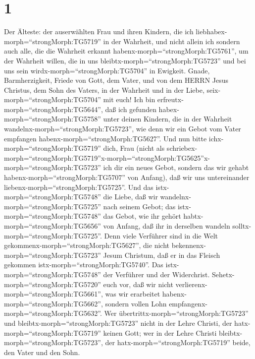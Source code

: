 \hypertarget{section}{%
\section{1}\label{section}}

 Der Älteste: der auserwählten Frau und ihren Kindern, die
ich liebhabex-morph=``strongMorph:TG5719'' in der Wahrheit, und nicht
allein ich sondern auch alle, die die Wahrheit erkannt
habenx-morph=``strongMorph:TG5761'',  um der Wahrheit
willen, die in uns bleibtx-morph=``strongMorph:TG5723'' und bei uns sein
wirdx-morph=``strongMorph:TG5704'' in Ewigkeit.  Gnade,
Barmherzigkeit, Friede von Gott, dem Vater, und von dem HERRN Jesus
Christus, dem Sohn des Vaters, in der Wahrheit und in der Liebe,
seix-morph=``strongMorph:TG5704'' mit euch!  Ich bin
erfreutx-morph=``strongMorph:TG5644'', daß ich gefunden
habex-morph=``strongMorph:TG5758'' unter deinen Kindern, die in der
Wahrheit wandelnx-morph=``strongMorph:TG5723'', wie denn wir ein Gebot
vom Vater empfangen habenx-morph=``strongMorph:TG5627''. 
Und nun bitte ichx-morph=``strongMorph:TG5719'' dich, Frau (nicht als
schriebex-morph=``strongMorph:TG5719''\textbar x-morph=``strongMorph:TG5625''x-morph=``strongMorph:TG5723''
ich dir ein neues Gebot, sondern das wir gehabt
habenx-morph=``strongMorph:TG5707'' von Anfang), daß wir uns
untereinander liebenx-morph=``strongMorph:TG5725''.  Und das
istx-morph=``strongMorph:TG5748'' die Liebe, daß wir
wandelnx-morph=``strongMorph:TG5725'' nach seinem Gebot; das
istx-morph=``strongMorph:TG5748'' das Gebot, wie ihr gehört
habtx-morph=``strongMorph:TG5656'' von Anfang, daß ihr in derselben
wandeln solltx-morph=``strongMorph:TG5725''.  Denn viele
Verführer sind in die Welt gekommenx-morph=``strongMorph:TG5627'', die
nicht bekennenx-morph=``strongMorph:TG5723'' Jesum Christum, daß er in
das Fleisch gekommen istx-morph=``strongMorph:TG5740''. Das
istx-morph=``strongMorph:TG5748'' der Verführer und der Widerchrist.
 Sehetx-morph=``strongMorph:TG5720'' euch vor, daß wir nicht
verlierenx-morph=``strongMorph:TG5661'', was wir erarbeitet
habenx-morph=``strongMorph:TG5662'', sondern vollen Lohn
empfangenx-morph=``strongMorph:TG5632''.  Wer
übertrittx-morph=``strongMorph:TG5723'' und
bleibtx-morph=``strongMorph:TG5723'' nicht in der Lehre Christi, der
hatx-morph=``strongMorph:TG5719'' keinen Gott; wer in der Lehre Christi
bleibtx-morph=``strongMorph:TG5723'', der
hatx-morph=``strongMorph:TG5719'' beide, den Vater und den Sohn.

